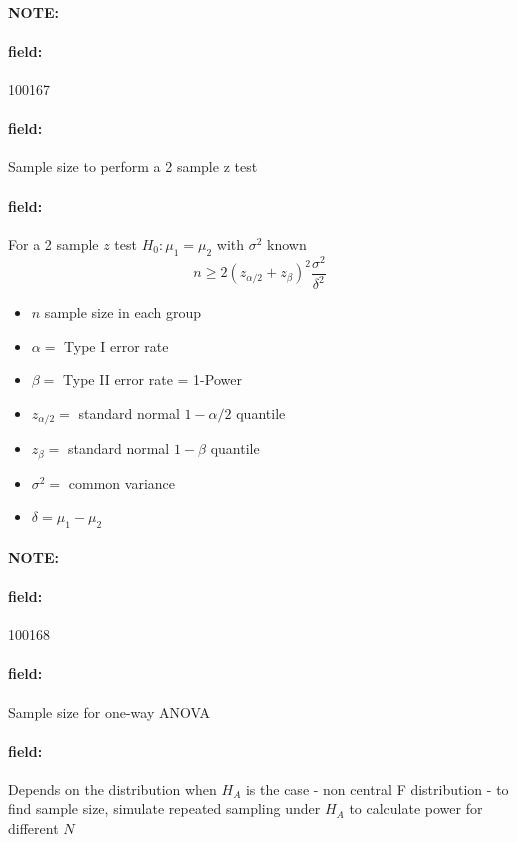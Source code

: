 \documentclass[12pt]{article}
\newenvironment{note}{\paragraph{NOTE:}}{}
\newenvironment{field}{\paragraph{field:}}{}
\begin{document}
\begin{note}
 \begin{field}
  \tiny 100167
 \end{field}
 \begin{field}
  Sample size to perform a 2 sample z test
 \end{field}
 \begin{field}
  For a 2 sample $z$ test $H_0: \mu_1 = \mu_2$ with $\sigma^2$ known
  $$ n \geq 2(z_{\alpha/2} + z_{\beta})^2 \frac{\sigma^2}{\delta^2}$$
  \begin{itemize}
   \item $n$ sample size in each group
   \item $\alpha = $ Type I error rate
   \item $\beta = $ Type II error rate = 1-Power
   \item $z_{\alpha/2}= $ standard normal $1 - \alpha/2$ quantile
   \item $z_{\beta} = $ standard normal $1 - \beta$ quantile
   \item $\sigma^2 = $ common variance
   \item $\delta = \mu_1 - \mu_2 $
  \end{itemize}
 \end{field}
\end{note}


\begin{note}
 \begin{field}
  \tiny 100168
 \end{field}
 \begin{field}
  Sample size for one-way ANOVA
 \end{field}
 \begin{field}
  Depends on the distribution when $H_A$ is the case - non central F distribution - to find sample size, simulate repeated sampling under $H_A$ to calculate power for different $N$
 \end{field}
\end{note}
\end{document}
